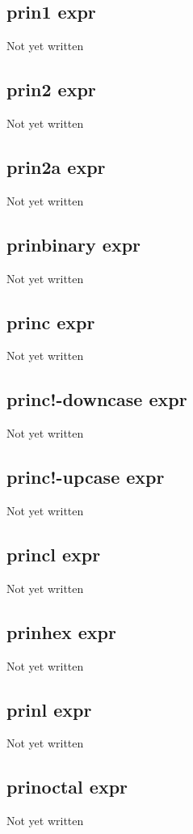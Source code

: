 \documentclass[a4paper,11pt]{article}
\begin{document}
{\subsection{\ttfamily prin1 expr}
Not yet written

\subsection{\ttfamily prin2 expr}
Not yet written

\subsection{\ttfamily prin2a expr}
Not yet written

\subsection{\ttfamily prinbinary expr}
Not yet written

\subsection{\ttfamily princ expr}
Not yet written

\subsection{\ttfamily princ!-downcase expr}
Not yet written

\subsection{\ttfamily princ!-upcase expr}
Not yet written

\subsection{\ttfamily princl expr}
Not yet written

\subsection{\ttfamily prinhex expr}
Not yet written

\subsection{\ttfamily prinl expr}
Not yet written

\subsection{\ttfamily prinoctal expr}
Not yet written

}
\end{document}
